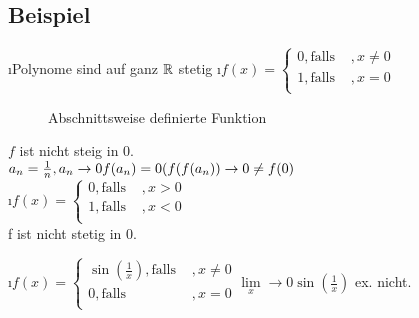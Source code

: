 \subsection{Beispiel}
\begin{enumerate}[a)]
\i Polynome sind auf ganz $\mathbb{R}$ stetig
\i $f(x) = \begin{cases}
0 , \text{falls }&, x \not = 0\\
1, \text{falls }&, x = 0\\
\end{cases} $
\begin{figure}[h!]
\centering
{}
\caption{Abschnittsweise definierte Funktion}
\end{figure}
$f$ ist nicht steig in 0.\\
$a_n = \frac{1}{n}, a_n \rightarrow 0\\
f(a_n) = 0\\
(f(f(a_n)) \rightarrow 0 \neq f(0)$\\
\i $f(x) = \begin{cases}
0 , \text{falls }&, x > 0\\
1, \text{falls }&, x < 0\\
\end{cases}$\\
f ist nicht stetig in 0.
\begin{minipage}[c]{0.3\textwidth}
\end{minipage} 
\i $f(x) = \begin{cases}
\sin(\frac{1}{x}) , \text{falls }&, x \not = 0\\
0, \text{falls }&, x = 0\\
\end{cases}
\lim\limits_x \rightarrow 0 \sin(\frac{1}{x})$ ex. nicht.\\

\end{enumerate}
